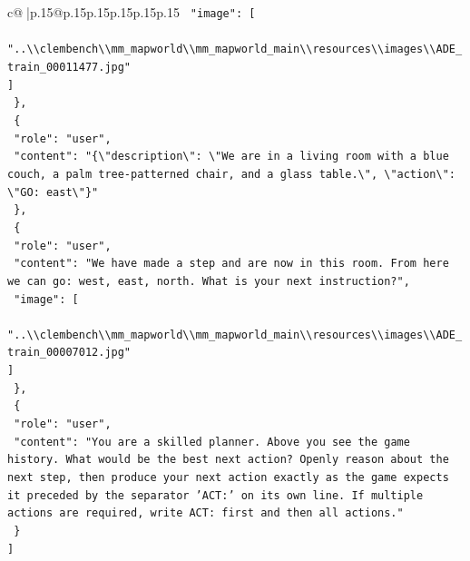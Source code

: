 \documentclass{article}
\begin{document}
{\begin{supertabular}{c@{$\;$}|p{.15\linewidth}@{}p{.15\linewidth}p{.15\linewidth}p{.15\linewidth}p{.15\linewidth}p{.15\linewidth}}
{{{\texttt{    "image": {[}} \\
\texttt{      "..\textbackslash{}\textbackslash{}clembench\textbackslash{}\textbackslash{}mm\_mapworld\textbackslash{}\textbackslash{}mm\_mapworld\_main\textbackslash{}\textbackslash{}resources\textbackslash{}\textbackslash{}images\textbackslash{}\textbackslash{}ADE\_train\_00011477.jpg"} \\
\texttt{    {]}} \\
\texttt{  \},} \\
\texttt{  \{} \\
\texttt{    "role": "user",} \\
\texttt{    "content": "\{\textbackslash{}"description\textbackslash{}": \textbackslash{}"We are in a living room with a blue couch, a palm tree{-}patterned chair, and a glass table.\textbackslash{}", \textbackslash{}"action\textbackslash{}": \textbackslash{}"GO: east\textbackslash{}"\}"} \\
\texttt{  \},} \\
\texttt{  \{} \\
\texttt{    "role": "user",} \\
\texttt{    "content": "We have made a step and are now in this room. From here we can go: west, east, north. What is your next instruction?",} \\
\texttt{    "image": {[}} \\
\texttt{      "..\textbackslash{}\textbackslash{}clembench\textbackslash{}\textbackslash{}mm\_mapworld\textbackslash{}\textbackslash{}mm\_mapworld\_main\textbackslash{}\textbackslash{}resources\textbackslash{}\textbackslash{}images\textbackslash{}\textbackslash{}ADE\_train\_00007012.jpg"} \\
\texttt{    {]}} \\
\texttt{  \},} \\
\texttt{  \{} \\
\texttt{    "role": "user",} \\
\texttt{    "content": "You are a skilled planner. Above you see the game history. What would be the best next action? Openly reason about the next step, then produce your next action exactly as the game expects it preceded by the separator 'ACT:' on its own line. If multiple actions are required, write ACT: first and then all actions."} \\
\texttt{  \}} \\
\texttt{{]}} \\
            }
        }
    }
     \\ \\


\end{supertabular}}
\end{document}
